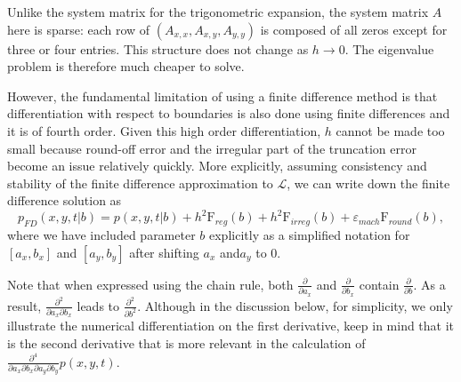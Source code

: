 \documentclass[10pt]{article}
\begin{document}
Unlike the system matrix for the trigonometric expansion, the system
matrix $A$ here is sparse: each row of $(A_{x,x}, A_{x,y}, A_{y,y})$
is composed of all zeros except for three or four entries. This
structure does not change as $h \to 0$. The eigenvalue problem is
therefore much cheaper to solve.

However, the fundamental limitation of using a finite difference
method is that differentiation with respect to boundaries is also done
using finite differences and it is of fourth order. Given this high
order differentiation, $h$ cannot be made too small because round-off
error and the irregular part of the truncation error become an issue
relatively quickly. More explicitly, assuming consistency and
stability of the finite difference approximation to $\mathcal{L}$, we
can write down the finite difference solution as
\[
  p_{FD}(\left. x, y, t \right| b) = p(\left. x, y, t \right| b) 
+ h^2 \mbox{F}_{reg}(b) + h^2 \mbox{F}_{irreg}(b) + 
\varepsilon_{mach} \mbox{F}_{round}(b),
\]
where we have included parameter $b $ explicitly as a simplified notation for 
$[a_x, b_x]$ and $[a_y, b_y]$ after shifting $a_x$ and$a_y$ to 0.

Note that when expressed using the chain rule, both 
$\displaystyle \frac{\partial}{\partial a_x}$ and  $\displaystyle \frac{\partial}{\partial b_x}$
contain $\displaystyle \frac{\partial}{\partial b}$. As a result, 
$\displaystyle \frac{\partial^2 }{\partial a_x \partial b_x} $ leads to 
$\displaystyle \frac{\partial^2 }{\partial b^2} $. Although in the discussion below, 
for simplicity, we only illustrate the numerical differentiation on the first derivative, 
keep in mind that it is the second derivative that is more relevant in the calculation of 
 $\displaystyle \frac{\partial^4}{\partial a_x \partial b_x \partial a_y \partial b_y}
p(x, y, t) $. 
\end{document}
